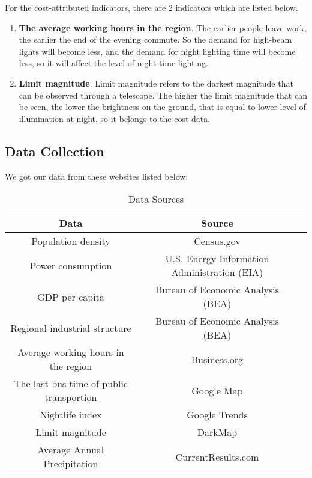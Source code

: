 For the cost-attributed indicators, there are 2 indicators which are listed below.
\begin{enumerate}
    \item \textbf{The average working hours in the region}. The earlier people leave work, the earlier the end of the evening commute. So the demand for high-beam lights will become less, and the demand for night lighting time will become less, so it will affect the level of night-time lighting.
    
    \item \textbf{Limit magnitude}. Limit magnitude refers to the darkest magnitude that can be observed through a telescope. The higher the limit magnitude that can be seen, the lower the brightness on the ground, that is equal to lower level of illumination at night, so it belongs to the cost data.
\end{enumerate}


\subsection{Data Collection}
We got our data from these websites listed below:
\begin{table}[H] \centering
    \caption{Data Sources}
    \begin{tabular}{ccl}
        \toprule
        Data & Source\\ \hline
        Population density & Census.gov \cite{bureau_historical_nodate} \\
        Power consumption & U.S. Energy Information Administration (EIA) \cite{eia} \\
        GDP per capita & Bureau of Economic Analysis (BEA)\cite{bea} \\
        Regional industrial structure & Bureau of Economic Analysis (BEA)\cite{bea} \\
        Average working hours in the region & Business.org \cite{overwork}\\
        The last bus time of public transportion & Google Map \cite{google_map}\\
        Nightlife index & Google Trends \cite{nightlife_index} \\
        Limit magnitude & DarkMap \cite{darkmap} \\
        Average Annual Precipitation & CurrentResults.com \cite{currentresults} \\
        \bottomrule
    \end{tabular}
\end{table}

